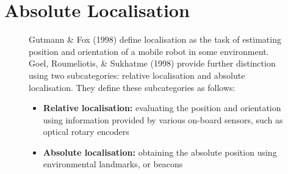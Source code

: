 \documentclass[a4paper]{article}
\begin{document}
\section{Absolute Localisation}
\begin{figure}[h]
\begin{minipage}{0.45\textwidth}
Gutmann \& Fox (1998) define localisation as the task of estimating position and orientation of a mobile robot in some environment. Goel, Roumeliotis, \& Sukhatme (1998) provide further distinction using two subcategories: relative localisation and absolute localisation. They define these subcategories as follows:
\begin{itemize}
\item \textbf{Relative localisation:} evaluating the position and orientation using information provided by various on-board sensors, such as optical rotary encoders
\item \textbf{Absolute localisation:} obtaining the absolute position using environmental landmarks, or beacons
\end{itemize}


\end{minipage}
\end{figure}
\end{document}
